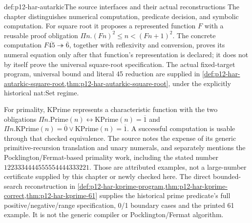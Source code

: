 \begin{hbdefinition}{def:p12-har-autarkic}{The source interfaces and their actual reconstructions}
The chapter distinguishes numerical computation, predicate decision, and
symbolic computation. For square root it proposes a represented function
\(F\) with a reusable proof obligation
\(\Pi n.(Fn)^2\le n<(Fn+1)^2\). The concrete computation
\(F\overline{45}\twoheadrightarrow\overline6\), together with
reflexivity and conversion, proves its numeral equation only after that
function's representation is declared; it does not by itself prove the
universal square-root specification.
The actual fixed-target program, universal bound and literal 45 reduction
are supplied in \cref{def:p12-har-autarkic-square-root,thm:p12-har-autarkic-square-root},
under the explicitly historical nat:Set regime.

For primality, \(\mathrm{KPrime}\) represents a characteristic
function with the two obligations
\(\Pi n.\mathrm{Prime}(n)\leftrightarrow
\mathrm{KPrime}(n)=\overline1\) and
\(\Pi n.\mathrm{KPrime}(n)=\overline0\lor
\mathrm{KPrime}(n)=\overline1\). A successful computation is usable
through that checked equivalence. The source notes the expense of its
generic primitive-recursion translation and unary numerals, and separately
mentions the Pocklington/Fermat-based primality work, including the stated
number \(1223334444555554444333221\). Those are attributed examples,
not a large-number certificate supplied by this chapter or newly checked
here. The direct bounded-search reconstruction in
\cref{def:p12-har-kprime-program,thm:p12-har-kprime-correct,thm:p12-har-kprime-61}
supplies the historical prime predicate's full positive/negative/range
specification, 0/1 boundary cases and the printed 61 example. It is not
the generic compiler or Pocklington/Fermat algorithm.


\end{hbdefinition}
